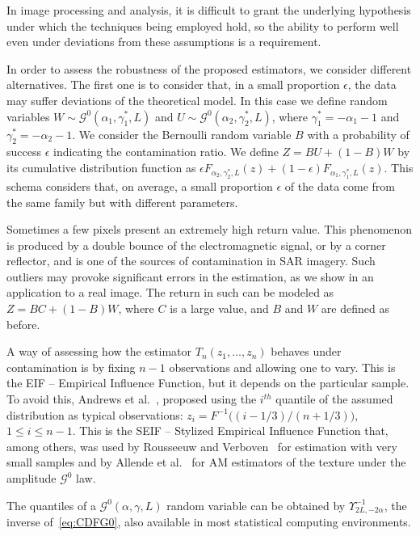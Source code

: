 \documentclass[twocolumn]{svjour3}
\begin{document}
In image processing and analysis, it is difficult to grant the underlying hypothesis under which the techniques being employed hold, so the ability to perform well even under deviations from these assumptions is a requirement.

In order to assess the robustness of the proposed estimators, we consider different alternatives. 
The first one is to consider that, in a small proportion $\epsilon$, the data may suffer deviations of the theoretical model. 
In this case we define random variables $W \sim \mathcal{G}^0(\alpha_1,\gamma_1^*,L)$ and $U \sim \mathcal{G}^0(\alpha_2,\gamma_2^*,L)$, where $\gamma_1^*=-\alpha_1-1$ and  $\gamma_2^*=-\alpha_2-1$. 
We consider the Bernoulli random variable $B$ with a probability of success $\epsilon$ indicating the contamination ratio.   
We define $Z=BU+(1-B)W$ by its cumulative distribution function as
$
\epsilon {F}_{\alpha_2,\gamma_2^*,L}(z)+(1-\epsilon) {F}_{\alpha_1,\gamma_1^*,L}(z)
$.
This schema considers that, on average, a small proportion $\epsilon$ of the data come from the same family but with different parameters. 

Sometimes a few pixels present an extremely high return value. 
This phenomenon is produced by a double bounce of the electromagnetic signal, or by a corner reflector, and is one of the sources of contamination in SAR imagery. 
Such outliers may provoke significant errors in the estimation, as we show in an application to a real image. 
The return in such can be modeled as $Z=BC+(1-B)W$, where $C$ is a large value, and $B$ and $W$ are defined as before.

A way of assessing how the estimator $T_n(z_1,\dots,z_n)$ behaves under contamination is by fixing $n-1$ observations and allowing one to vary.
This is the EIF -- Empirical Influence Function, but it depends on the particular sample.
To avoid this, Andrews et al.~\cite{Andrews1972}, proposed using the $i^{th}$ quantile of the assumed distribution as typical observations: $z_i=F^{-1}\big((i-1/3)/(n+1/3) \big)$, $1\leq i\leq n-1$.
This is the SEIF -- Stylized Empirical Influence Function that, among others, was used by Rousseeuw and Verboven~\cite{RousseeuwCSDA} for estimation with very small samples and by Allende et al.~\cite{AllendeFreryetal:JSCS:05} for AM estimators of the texture under the amplitude $\mathcal G^0$ law.

The quantiles of a $\mathcal G^0(\alpha,\gamma,L)$ random variable can be obtained by $\Upsilon^{-1}_{2L,-2\alpha}$, the inverse of~\eqref{eq:CDFG0}, also available in most statistical computing environments.
\end{document}
